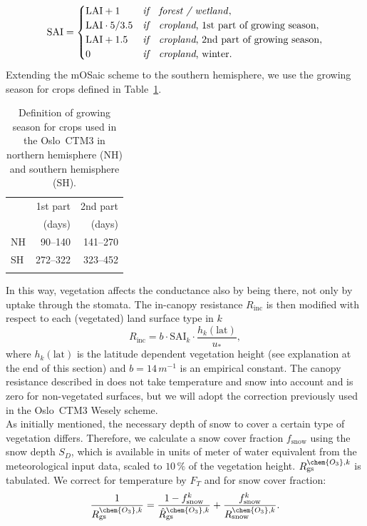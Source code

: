 \documentclass[gmd, manuscript]{copernicus}
\begin{document}
%
\begin{equation}
  \text{SAI} = 
  \begin{cases}
    \text{LAI}+1 & \emph{if} \quad \text{\emph{forest / wetland}},\\
    \text{LAI}\cdot 5/3.5 & \emph{if} \quad \text{\emph{cropland}, 1st part of growing season},\\
    \text{LAI} + 1.5 & \emph{if} \quad \text{\emph{cropland}, 2nd part of growing season},\\
    0 & \emph{if} \quad \text{\emph{cropland}, winter}.
  \end{cases}
  \label{eq:SAI}
\end{equation}
%
Extending the mOSaic scheme to the southern hemisphere, we use the growing season for crops defined in Table~\ref{tab:growing_season}.
%
\begin{table}[t]
  \caption{Definition of growing season for crops used in the Oslo~CTM3 in northern hemisphere (NH) and southern hemisphere (SH).}
  \begin{tabular}{lrr}
    \tophline
    & 1st part & 2nd part \\
    & (days) & (days) \\
    \middlehline
    NH & 90--140 & 141--270 \\
    SH & 272--322 & 323--452 \\
    \bottomhline
  \end{tabular}
  \label{tab:growing_season}
\end{table}
%

In this way, vegetation affects the conductance also by being there, not only by uptake through the stomata. The in-canopy resistance $R_\text{inc}$ \citep{AE:Erisman1994} is then modified with respect to each (vegetated) land surface type in $k$
\begin{equation}
  R_\text{inc} = b \cdot \text{SAI}_k \cdot \frac{h_k(\text{lat})}{u_*},
\end{equation}
where $h_k(\text{lat})$ is the latitude dependent vegetation height (see explanation at the end of this section) and $b = 14\,\unit{m^{-1}}$ is an empirical constant. The canopy resistance described in \citet{ACP:Simpson2012} does not take temperature and snow into account and is zero for non-vegetated surfaces, but we will adopt the correction previously used in the Oslo~CTM3 Wesely scheme.\\
As initially mentioned, the necessary depth of snow to cover a certain type of vegetation differs. Therefore, we calculate a snow cover fraction $f_\text{snow}$ using the snow depth $S_D$, which is available in units of meter of water equivalent from the meteorological input data, scaled to $10\,\unit{\%}$ of the vegetation height.
$R_\text{gs}^{\chem{O_3},k}$ is tabulated. We correct for temperature by $F_T$ and for snow cover fraction:
\begin{equation}
  \frac{1}{R_\text{gs}^{\chem{O_3},k}} = \frac{1-f_\text{snow}^k}{\hat{R}_\text{gs}^{\chem{O_3},k}} + \frac{f_\text{snow}^k}{R_\text{snow}^{\chem{O_3},k}}.
\end{equation}
\end{document}

